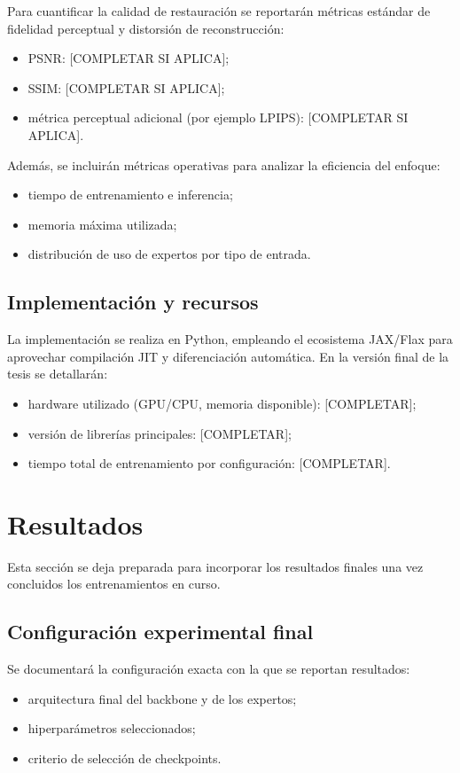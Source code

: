 \documentclass[aps,prl,twocolumn,groupedaddress]{revtex4-2}
\begin{document}
Para cuantificar la calidad de restauración se reportarán métricas estándar de fidelidad perceptual y distorsión de reconstrucción:
\begin{itemize}
    \item PSNR: [COMPLETAR SI APLICA];
    \item SSIM: [COMPLETAR SI APLICA];
    \item métrica perceptual adicional (por ejemplo LPIPS): [COMPLETAR SI APLICA].
\end{itemize}

Además, se incluirán métricas operativas para analizar la eficiencia del enfoque:
\begin{itemize}
    \item tiempo de entrenamiento e inferencia;
    \item memoria máxima utilizada;
    \item distribución de uso de expertos por tipo de entrada.
\end{itemize}

\subsection{Implementación y recursos}

La implementación se realiza en Python, empleando el ecosistema JAX/Flax para aprovechar compilación JIT y diferenciación automática. En la versión final de la tesis se detallarán:
\begin{itemize}
    \item hardware utilizado (GPU/CPU, memoria disponible): [COMPLETAR];
    \item versión de librerías principales: [COMPLETAR];
    \item tiempo total de entrenamiento por configuración: [COMPLETAR].
\end{itemize}

\section{Resultados}

Esta sección se deja preparada para incorporar los resultados finales una vez concluidos los entrenamientos en curso.

\subsection{Configuración experimental final}

Se documentará la configuración exacta con la que se reportan resultados:
\begin{itemize}
    \item arquitectura final del backbone y de los expertos;
    \item hiperparámetros seleccionados;
    \item criterio de selección de checkpoints.
\end{itemize}
\end{document}
